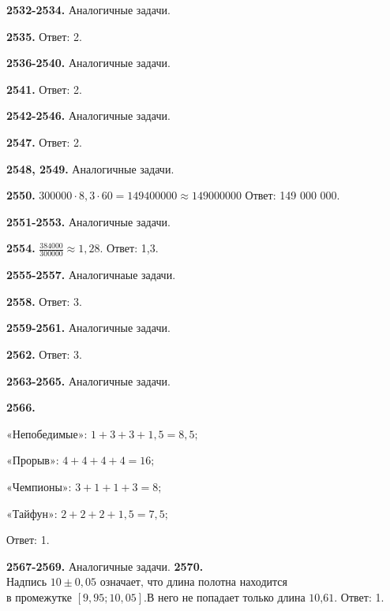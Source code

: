 \textbf{2532-2534.} Аналогичные задачи.

\textbf{2535.} Ответ: 2.

\textbf{2536-2540.} Аналогичные задачи.

\textbf{2541.} Ответ: 2.

\textbf{2542-2546.} Аналогичные задачи.

\textbf{2547.} Ответ: 2.

\textbf{2548, 2549.} Аналогичные задачи.

\textbf{2550.} $300000\cdot 8,3\cdot 60 = 149400000 \approx 149000000$\newline \null \hspace*{\fill} Ответ: 149 000 000. 

\textbf{2551-2553.} Аналогичные задачи.

\textbf{2554.} $\frac{384000}{300000} \approx 1,28.$ \newline \null \hspace*{\fill} Ответ: 1,3. 

\textbf{2555-2557.} Аналогичнаые задачи.

\textbf{2558.} Ответ: 3.

\textbf{2559-2561.} Аналогичные задачи. 

\textbf{2562.} \newline{}\newline{} \null \hspace*{\fill} Ответ: 3. 

\textbf{2563-2565.} Аналогичные задачи.

\textbf{2566.}\newline\centerline{$\text{«Непобедимые»:    } 1 + 3 + 3 + 1,5 = 8,5;$}\newline\centerline{$\text{«Прорыв»:    } 4 + 4 + 4 + 4 = 16;$}\newline\centerline{$\text{«Чемпионы»:    } 3 + 1 + 1 + 3 = 8;$}\newline\centerline{$\text{«Тайфун»:    } 2 + 2 + 2 + 1,5 = 7,5; $} \null \hspace*{\fill} Ответ: 1. 

\textbf{2567-2569.} Аналогичные задачи.\newline
\textbf{2570.} $\text{Надпись } 10 \pm 0,05 \text{ означает, что длина полотна находится}$\newline$\text{в промежутке } [9,95;10,05].$\newline$\text{В него не попадает только длина 10,61.}$ \null \hspace*{\fill} Ответ: 1. 

